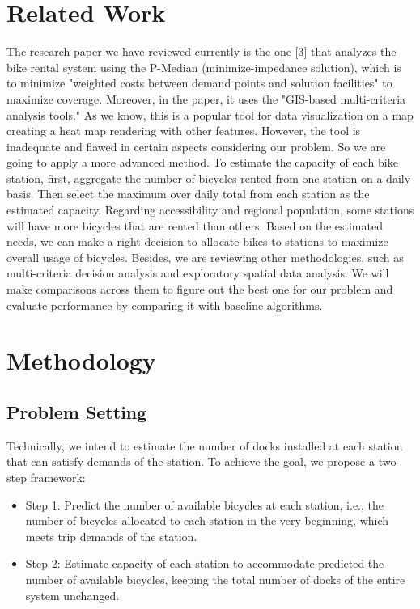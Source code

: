 \documentclass[journal, letterpaper]{IEEEtran}
\begin{document}
\section{Related Work}
\large
The research paper we have reviewed currently is the one [3] that analyzes the bike rental system using the P-Median (minimize-impedance solution), which is to minimize "weighted costs between demand points and solution facilities" to maximize coverage. Moreover, in the paper, it uses the "GIS-based multi-criteria analysis tools." As we know, this is a popular tool for data visualization on a map creating a heat map rendering with other features. However, the tool is inadequate and flawed in certain aspects considering our problem. So we are going to apply a more advanced method. To estimate the capacity of each bike station, first, aggregate the number of bicycles rented from one station on a daily basis. Then select the maximum over daily total from each station as the estimated capacity. Regarding accessibility and regional population, some stations will have more bicycles that are rented than others. Based on the estimated needs, we can make a right decision to allocate bikes to stations to maximize overall usage of bicycles. Besides, we are reviewing other methodologies, such as multi-criteria decision analysis and exploratory spatial data analysis. We will make comparisons across them to figure out the best one for our problem and evaluate performance by comparing it with baseline algorithms.

\section{Methodology}
\large
\subsection{Problem Setting}
Technically, we intend to estimate the number of docks installed at each station that can satisfy demands of the station. To achieve the goal, we propose a two-step framework:
\begin{itemize}

\item Step 1: Predict the number of available bicycles at each station, i.e., the number of bicycles allocated to each station in the very beginning, which meets trip demands of the station. 
\item Step 2: Estimate capacity of each station to accommodate predicted the number of available bicycles, keeping the total number of docks of the entire system unchanged.
\end{itemize}
\end{document}
